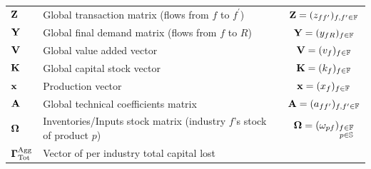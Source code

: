 \documentclass[main.tex]{subfiles}
\begin{document}
{\begin{table}[H]
\begin{tabularx}{\linewidth}{
      p{4.5cm}Xc
      }
      $\mathbf{Z}$ & Global transaction matrix (flows from $f$ to $f^{\prime}$) & $\mathbf{Z} = (z_{ff^{\prime}})_{f,f^{\prime} \in \mathbb{F}}$ \\
      $\mathbf{Y}$ & Global final demand matrix (flows from $f$ to $R$) & $\mathbf{Y} = (y_{fR})_{f \in \mathbb{F}}$ \\
      $\mathbf{V}$ & Global value added vector & $\mathbf{V} =  (v_{f})_{f \in \mathbb{F}}$ \\
      $\mathbf{K}$ & Global capital stock vector & $\mathbf{K} =  (k_{f})_{f \in \mathbb{F}}$ \\
      $\mathbf{x}$ & Production vector & $\mathbf{x} = (x_{f})_{f \in \mathbb{F}}$ \\
      $\mathbf{A}$ & Global technical coefficients matrix & $\mathbf{A} =  (a_{ff^{\prime}})_{f,f^{\prime} \in \mathbb{F}}$ \\
      $\mathbf{\Omega}$ & Inventories/Inputs stock matrix (industry $f$'s stock of
                 product $p$) & $\mathbf{\Omega} = (\omega_{pf})_{\substack{f \in \mathbb{F}\\ p \in \mathbb{S}}}$ \\
      $\mathbf{\Gamma}^{\textrm{Agg}}_{\textrm{Tot}}$ & Vector of per industry total capital lost

\end{tabularx}
\end{table}}
\end{document}

